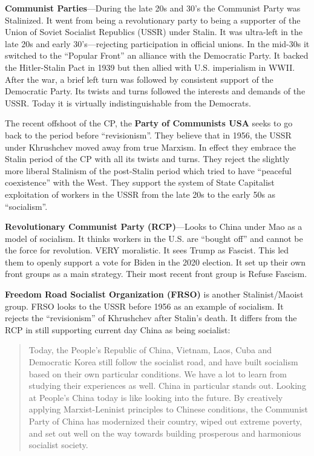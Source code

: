 \textbf{Communist Parties}---During the late 20s and 30's the Communist Party was Stalinized. It went from being a revolutionary party to being a supporter of the Union of Soviet Socialist Republics (USSR) under Stalin. It was ultra-left in the late 20s and early 30's---rejecting participation in official unions. In the mid-30s it switched to the ``Popular Front'' an alliance with the Democratic Party. It backed the Hitler-Stalin Pact in 1939 but then allied with U.S. imperialism in WWII. After the war, a brief left turn was followed by consistent support of the Democratic Party. Its twists and turns followed the interests and demands of the USSR. Today it is virtually indistinguishable from the Democrats.

The recent offshoot of the CP, the \textbf{Party of Communists USA} seeks to go back to the period before ``revisionism''. They believe that in 1956, the USSR under Khrushchev moved away from true Marxism. In effect they embrace the Stalin period of the CP with all its twists and turns. They reject the slightly more liberal Stalinism of the post-Stalin period which tried to have ``peaceful coexistence'' with the West. They support the system of State Capitalist exploitation of workers in the USSR from the late 20s to the early 50s as ``socialism''.

\textbf{Revolutionary Communist Party (RCP)}---Looks to China under Mao as a model of socialism. It thinks workers in the U.S. are ``bought off'' and cannot be the force for revolution. VERY moralistic. It sees Trump as Fascist. This led them to openly support a vote for Biden in the 2020 election. It set up their own front groups as a main strategy. Their most recent front group is Refuse Fascism.

\textbf{Freedom Road Socialist Organization (FRSO)} is another Stalinist/Maoist group. FRSO looks to the USSR before 1956 as an example of socialism. It rejects the ``revisionism'' of Khrushchev after Stalin's death. It differs from the RCP in still supporting current day China as being socialist:

\blockquote{Today, the People's Republic of China, Vietnam, Laos, Cuba and Democratic Korea still follow the socialist road, and have built socialism based on their own particular conditions. We have a lot to learn from studying their experiences as well. China in particular stands out. Looking at People's China today is like looking into the future. By creatively applying Marxist-Leninist principles to Chinese conditions, the Communist Party of China has modernized their country, wiped out extreme poverty, and set out well on the way towards building prosperous and harmonious socialist society.}

